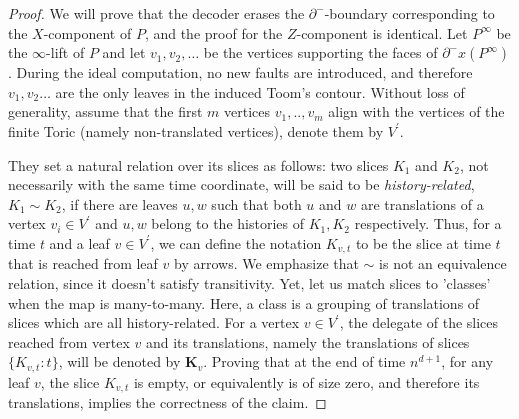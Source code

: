 \begin{proof}
  We will prove that the decoder erases the $\partial^{-}$-boundary corresponding to the $X$-component of $P$, and the proof for the $Z$-component is identical. Let $P^{\infty}$ be the $\infty$-lift of $P$ and let $v_{1}, v_{2}, \ldots$ be the vertices supporting the faces of $\partial^{-}x(P^{\infty})$. During the ideal computation, no new faults are introduced, and therefore $v_{1}, v_{2} \ldots$ are the only leaves in the induced Toom's contour. Without loss of generality, assume that the first $m$ vertices $v_{1},..,v_{m}$ align with the vertices of the finite Toric (namely non-translated vertices), denote them by $V^{\prime}$. 

  
  They set a natural relation over its slices as follows: two slices $K_{1}$ and $K_{2}$, not necessarily with the same time coordinate, will be said to be \textit{history-related}, $K_{1}\sim K_{2}$, if there are leaves $u, w$ such that both $u$ and $w$ are translations of a vertex $v_{i} \in V^{\prime}$ and $u, w$ belong to the histories of $K_{1}, K_{2}$ respectively.
  Thus, for a time $t$ and a leaf $v \in V^{\prime}$, we can define the notation $K_{v,t}$ to be the slice at time $t$ that is reached from leaf $v$ by arrows. We emphasize that $\sim$ is not an equivalence relation, since it doesn't satisfy transitivity. Yet, let us match slices to 'classes' when the map is many-to-many. Here, a class is a grouping of translations of slices which are all history-related. For a vertex $v \in V^{\prime}$, the delegate of the slices reached from vertex $v$ and its translations, namely the translations of slices $\{ K_{v,t} : t \}$, will be denoted by $\mathbf{K}_{v}$. Proving that at the end of time $n^{d+1}$, for any leaf $v$, the slice $K_{v,t}$ is empty, or equivalently is of size zero, and therefore its translations, implies the correctness of the claim.



\end{proof}
